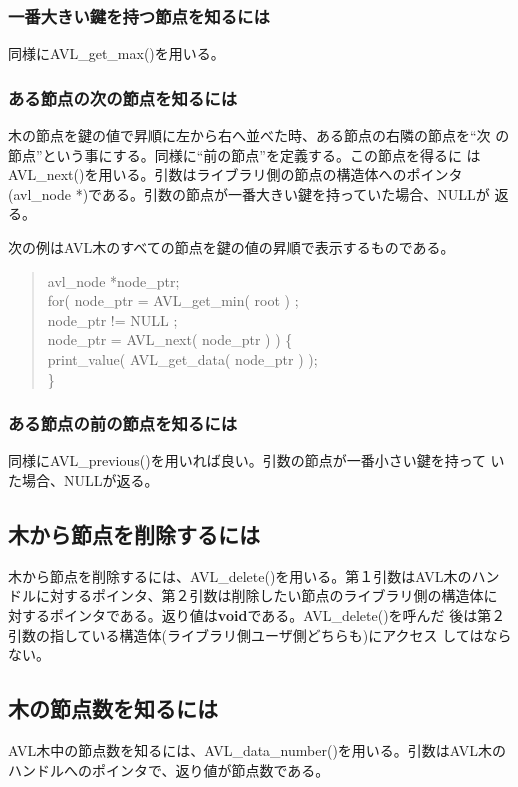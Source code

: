 \subsubsection{一番大きい鍵を持つ節点を知るには}
同様にAVL\_get\_max()を用いる。

\subsubsection{ある節点の次の節点を知るには}
木の節点を鍵の値で昇順に左から右へ並べた時、ある節点の右隣の節点を``次
の節点''という事にする。同様に``前の節点''を定義する。この節点を得るに
はAVL\_next()を用いる。引数はライブラリ側の節点の構造体へのポインタ
(avl\_node *)である。引数の節点が一番大きい鍵を持っていた場合、NULLが
返る。

次の例はAVL木のすべての節点を鍵の値の昇順で表示するものである。
\begin{quote}
avl\_node *node\_ptr;\\
for( node\_ptr = AVL\_get\_min( root ) ;\\
\hspace*{1cm}node\_ptr != NULL ;\\
\hspace*{1cm}node\_ptr = AVL\_next( node\_ptr ) ) \{\\
\hspace*{2cm}print\_value( AVL\_get\_data( node\_ptr ) );\\
\}
\end{quote}

\subsubsection{ある節点の前の節点を知るには}
同様にAVL\_previous()を用いれば良い。引数の節点が一番小さい鍵を持って
いた場合、NULLが返る。

\subsection{木から節点を削除するには}
木から節点を削除するには、AVL\_delete()を用いる。第１引数はAVL木のハン
ドルに対するポインタ、第２引数は削除したい節点のライブラリ側の構造体に
対するポインタである。返り値は{\bf void}である。AVL\_delete()を呼んだ
後は第２引数の指している構造体(ライブラリ側ユーザ側どちらも)にアクセス
してはならない。

\subsection{木の節点数を知るには}
AVL木中の節点数を知るには、AVL\_data\_number()を用いる。引数はAVL木の
ハンドルへのポインタで、返り値が節点数である。

